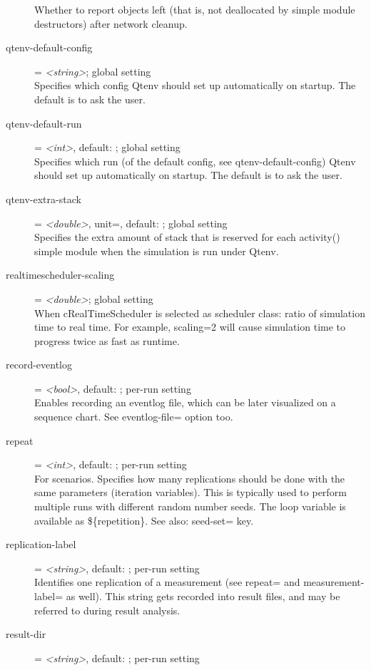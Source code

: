 \begin{description}
    Whether to report objects left (that is, not deallocated by simple module
    destructors) after network cleanup.
\item[qtenv-default-config] = \textit{<string>}; global setting \\
    Specifies which config Qtenv should set up automatically on startup. The
    default is to ask the user.
\item[qtenv-default-run] = \textit{<int>}, default: ; global setting \\
    Specifies which run (of the default config, see qtenv-default-config) Qtenv
    should set up automatically on startup. The default is to ask the user.
\item[qtenv-extra-stack] = \textit{<double>}, unit=, default: ; global setting \\
    Specifies the extra amount of stack that is reserved for each activity()
    simple module when the simulation is run under Qtenv.
\item[realtimescheduler-scaling] = \textit{<double>}; global setting \\
    When cRealTimeScheduler is selected as scheduler class: ratio of simulation
    time to real time. For example, scaling=2 will cause simulation time to
    progress twice as fast as runtime.
\item[record-eventlog] = \textit{<bool>}, default: ; per-run setting \\
    Enables recording an eventlog file, which can be later visualized on a
    sequence chart. See eventlog-file= option too.
\item[repeat] = \textit{<int>}, default: ; per-run setting \\
    For scenarios. Specifies how many replications should be done with the same
    parameters (iteration variables). This is typically used to perform
    multiple runs with different random number seeds. The loop variable is
    available as \$\{repetition\}. See also: seed-set= key.
\item[replication-label] = \textit{<string>}, default: ; per-run setting \\
    Identifies one replication of a measurement (see repeat= and
    measurement-label= as well). This string gets recorded into result files,
    and may be referred to during result analysis.
\item[result-dir] = \textit{<string>}, default: ; per-run setting \\

\end{description}
